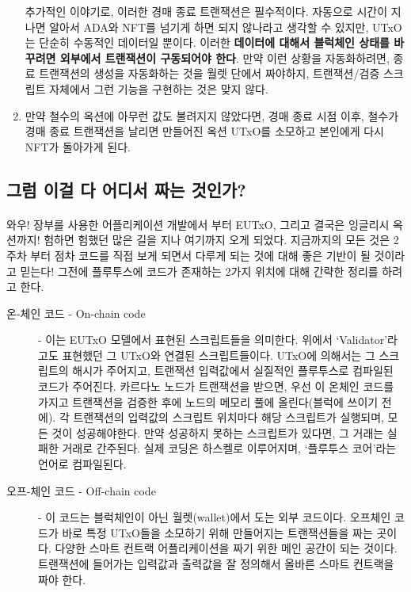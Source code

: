 \documentclass[a4paper, 11pt]{article}
\begin{document}
\begin{enumerate}
        추가적인 이야기로, 이러한 경매 종료 트랜잭션은 필수적이다. 자동으로 시간이 지나면 알아서 ADA와 NFT를 넘기게 하면 되지 않나라고 생각할 수 있지만, UTxO는 단순히 수동적인 데이터일 뿐이다. 이러한 \textbf{데이터에 대해서 블럭체인 상태를 바꾸려면 외부에서 트랜잭션이 구동되어야 한다}. 만약 이런 상황을 자동화하려면, 종료 트랜잭션의 생성을 자동화하는 것을 월렛 단에서 짜야하지, 트랜잭션/검증 스크립트 자체에서 그런 기능을 구현하는 것은 맞지 않다.
        \item 만약 철수의 옥션에 아무런 값도 불려지지 않았다면, 경매 종료 시점 이후, 철수가 경매 종료 트랜잭션을 날리면 만들어진 옥션 UTxO를 소모하고 본인에게 다시 NFT가 돌아가게 된다.

    \end{enumerate}

    \subsection{그럼 이걸 다 어디서 짜는 것인가?}

    \paragraph{} 와우! 장부를 사용한 어플리케이션 개발에서 부터 EUTxO, 그리고 결국은 잉글리시 옥션까지! 험하면 험했던 많은 길을 지나 여기까지 오게 되었다. 지금까지의 모든 것은 2주차 부터 점차 코드를 직접 보게 되면서 다루게 되는 것에 대해 좋은 기반이 될 것이라고 믿는다! 그전에 플루투스에 코드가 존재하는 2가지 위치에 대해 간략한 정리를 하려고 한다.

    \begin{description}
        \item[온-체인 코드  - On-chain code] - 이는 EUTxO 모델에서 표현된 스크립트들을 의미한다. 위에서 `Validator'라고도 표현했던 그 UTxO와 연결된 스크립트들이다. UTxO에 의해서는 그 스크립트의 해시가 주어지고, 트랜잭션 입력값에서 실질적인 플루투스로 컴파일된 코드가 주어진다. 카르다노 노드가 트랜잭션을 받으면, 우선 이 온체인 코드를 가지고 트랜잭션을 검증한 후에 노드의 메모리 풀에 올린다(블럭에 쓰이기 전에). 각 트랜잭션의 입력값의 스크립트 위치마다 해당 스크립트가 실행되며, 모든 것이 성공해야한다. 만약 성공하지 못하는 스크립트가 있다면, 그 거래는 실패한 거래로 간주된다. 실제 코딩은 하스켈로 이루어지며, `플루투스 코어'라는 언어로 컴파일된다. 
        \item[오프-체인 코드 - Off-chain code] - 이 코드는 블럭체인이 아닌 월렛(wallet)에서 도는 외부 코드이다. 오프체인 코드가 바로 특정 UTxO들을 소모하기 위해 만들어지는 트랜잭션들을 짜는 곳이다. 다양한 스마트 컨트랙 어플리케이션을 짜기 위한 메인 공간이 되는 것이다. 트랜잭션에 들어가는 입력값과 출력값을 잘 정의해서 올바른 스마트 컨트랙을 짜야 한다.   
    \end{description}
\end{document}
